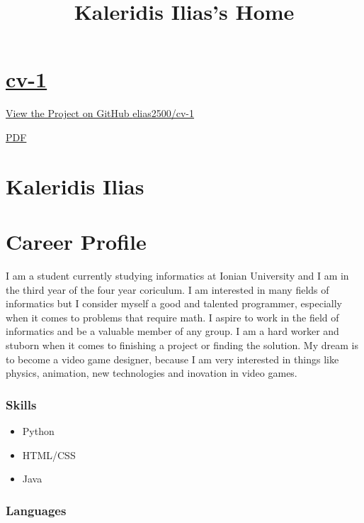 \documentclass[american,]{article}
\title{Kaleridis Ilias's Home}
\date{}
\begin{document}
\maketitle

\hypertarget{cv-1}{%
\section{\texorpdfstring{\href{https://elias2500.github.io/cv-1/}{cv-1}}{cv-1}}\label{cv-1}}

\href{https://github.com/elias2500/cv-1}{View the Project on GitHub
{elias2500/cv-1}}

\href{pdf/index.pdf}{PDF}

\hypertarget{kaleridis-ilias}{%
\section{Kaleridis Ilias}\label{kaleridis-ilias}}

\hypertarget{career-profile}{%
\section{Career Profile}\label{career-profile}}

I am a student currently studying informatics at Ionian University and I
am in the third year of the four year coriculum. I am interested in many
fields of informatics but I consider myself a good and talented
programmer, especially when it comes to problems that require math. I
aspire to work in the field of informatics and be a valuable member of
any group. I am a hard worker and stuborn when it comes to finishing a
project or finding the solution. My dream is to become a video game
designer, because I am very interested in things like physics,
animation, new technologies and inovation in video games.

\hypertarget{skills}{%
\subsubsection{Skills}\label{skills}}

\begin{itemize}
\item
  Python
\item
  HTML/CSS
\item
  Java
\end{itemize}

\hypertarget{languages}{%
\subsubsection{Languages}\label{languages}}
\end{document}
